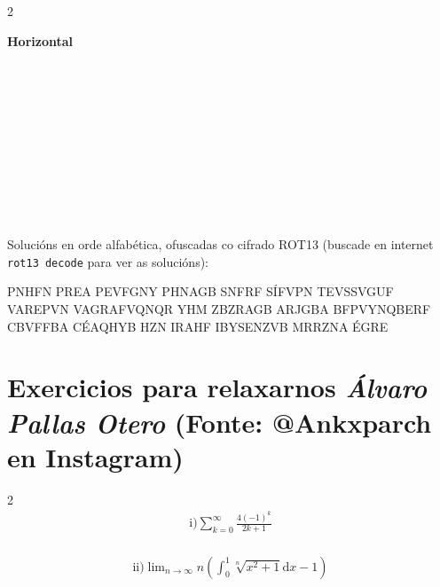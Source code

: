 \begin{refsection}
\begin{multicols}{2}
\begin{PuzzleClues}{\textbf{Horizontal}}\\
\\
\\
\\
\\
\\
\\
\\
\\
\\
\\
\end{PuzzleClues}
\end{multicols}


\begin{center}
Solucións en orde alfabética, ofuscadas co cifrado ROT13 (buscade en internet \texttt{rot13 decode} para ver as solucións):

\vspace*{1em}

PNHFN PREA PEVFGNY PHNAGB SNFRF SÍFVPN TEVSSVGUF VAREPVN VAGRAFVQNQR YHM
ZBZRAGB ARJGBA BFPVYNQBERF CBVFFBA CÉAQHYB HZN IRAHF IBYSENZVB MRRZNA ÉGRE
\end{center}

\section*{\textcolor{Resalte}{Exercicios para relaxarnos}  {\normalfont \itshape Álvaro Pallas Otero}   \hfill     {\small (Fonte: @Ankxparch en Instagram)}}%

\begin{multicols}{2}
\begin{gather*}
    \text{i)} \sum_{k=0}^\infty \frac{4(-1)^k}{2k+1}
\end{gather*}\\
\begin{gather*}
    \text{ii)} \mathop{\text{lim}}_{n\rightarrow \infty} n\left(\int_0^1 \sqrt[n]{x^2+1}\text{d}x -1\right)
\end{gather*}
\end{multicols}


\end{refsection}
